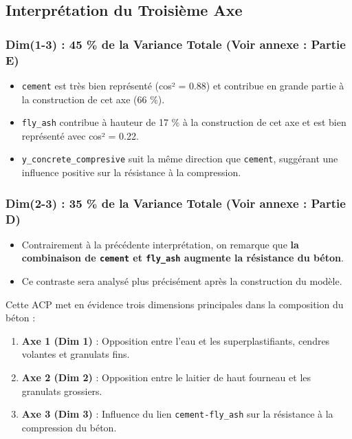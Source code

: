 \documentclass[
  12pt,
]{article}
\providecommand{\tightlist}{%
  \setlength{\itemsep}{0pt}\setlength{\parskip}{0pt}}
\begin{document}
\subsection{Interprétation du Troisième
Axe}\label{interpruxe9tation-du-troisiuxe8me-axe}

\subsubsection{Dim(1-3) : 45 \% de la Variance Totale (Voir annexe :
Partie E)}\label{dim1-3-45-de-la-variance-totale-voir-annexe-partie-e}

\begin{itemize}
\tightlist
\item
  \texttt{cement} est très bien représenté (cos² = 0.88) et contribue en
  grande partie à la construction de cet axe (66 \%).
\item
  \texttt{fly\_ash} contribue à hauteur de 17 \% à la construction de
  cet axe et est bien représenté avec cos² = 0.22.
\item
  \texttt{y\_concrete\_compresive} suit la même direction que
  \texttt{cement}, suggérant une influence positive sur la résistance à
  la compression.
\end{itemize}

\subsubsection{Dim(2-3) : 35 \% de la Variance Totale (Voir annexe :
Partie D)}\label{dim2-3-35-de-la-variance-totale-voir-annexe-partie-d}

\begin{itemize}
\tightlist
\item
  Contrairement à la précédente interprétation, on remarque que
  \textbf{la combinaison de \texttt{cement} et \texttt{fly\_ash}
  augmente la résistance du béton}.
\item
  Ce contraste sera analysé plus précisément après la construction du
  modèle.
\end{itemize}

Cette ACP met en évidence trois dimensions principales dans la
composition du béton :

\begin{enumerate}
\def\labelenumi{\arabic{enumi}.}
\tightlist
\item
  \textbf{Axe 1 (Dim 1)} : Opposition entre l'eau et les
  superplastifiants, cendres volantes et granulats fins.
\item
  \textbf{Axe 2 (Dim 2)} : Opposition entre le laitier de haut fourneau
  et les granulats grossiers.
\item
  \textbf{Axe 3 (Dim 3)} : Influence du lien \texttt{cement-fly\_ash}
  sur la résistance à la compression du béton.
\end{enumerate}
\end{document}
